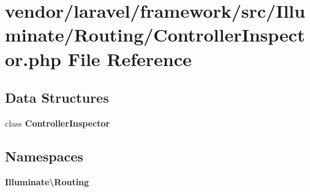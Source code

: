 \section{vendor/laravel/framework/src/\+Illuminate/\+Routing/\+Controller\+Inspector.php File Reference}
\label{_controller_inspector_8php}
\subsection*{Data Structures}
\begin{DoxyCompactItemize}
\item 
class {\bf Controller\+Inspector}
\end{DoxyCompactItemize}
\subsection*{Namespaces}
\begin{DoxyCompactItemize}
\item 
 {\bf Illuminate\textbackslash{}\+Routing}
\end{DoxyCompactItemize}
